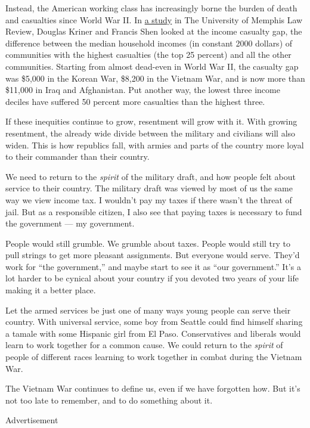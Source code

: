 Instead, the American working class has increasingly borne the burden of
death and casualties since World War II. In
\href{http://www.memphis.edu/law/documents/kriner-shen46.pdf}{a study}
in The University of Memphis Law Review, Douglas Kriner and Francis Shen
looked at the income casualty gap, the difference between the median
household incomes (in constant 2000 dollars) of communities with the
highest casualties (the top 25 percent) and all the other communities.
Starting from almost dead-even in World War II, the casualty gap was
\$5,000 in the Korean War, \$8,200 in the Vietnam War, and is now more
than \$11,000 in Iraq and Afghanistan. Put another way, the lowest three
income deciles have suffered 50 percent more casualties than the highest
three.

If these inequities continue to grow, resentment will grow with it. With
growing resentment, the already wide divide between the military and
civilians will also widen. This is how republics fall, with armies and
parts of the country more loyal to their commander than their country.

We need to return to the \emph{spirit} of the military draft, and how
people felt about service to their country. The military draft was
viewed by most of us the same way we view income tax. I wouldn't pay my
taxes if there wasn't the threat of jail. But as a responsible citizen,
I also see that paying taxes is necessary to fund the government --- my
government.

People would still grumble. We grumble about taxes. People would still
try to pull strings to get more pleasant assignments. But everyone would
serve. They'd work for ``the government,'' and maybe start to see it as
``our government.'' It's a lot harder to be cynical about your country
if you devoted two years of your life making it a better place.

Let the armed services be just one of many ways young people can serve
their country. With universal service, some boy from Seattle could find
himself sharing a tamale with some Hispanic girl from El Paso.
Conservatives and liberals would learn to work together for a common
cause. We could return to the \emph{spirit} of people of different races
learning to work together in combat during the Vietnam War.

The Vietnam War continues to define us, even if we have forgotten how.
But it's not too late to remember, and to do something about it.

Advertisement

